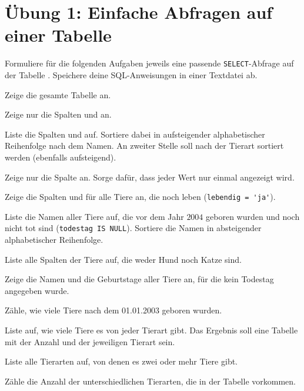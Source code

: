 \clearpage

\rehead[]{\textcolor{lightblue}{AvHG, Inf, My}}
\lohead[]{\textcolor{lightblue}{AvHG, Inf, My}}

\section{Übung 1: Einfache Abfragen auf einer Tabelle}

Formuliere für die folgenden Aufgaben jeweils eine passende
\lstinline|SELECT|-Abfrage auf der Tabelle . Speichere deine
SQL-Anweisungen in einer Textdatei ab.

\begin{compactenum}[a)]
\item Zeige die gesamte Tabelle  an.
\item Zeige nur die Spalten  und  an.
\item Liste die Spalten  und  auf.
Sortiere dabei in aufsteigender alphabetischer Reihenfolge nach dem Namen. An
zweiter Stelle soll nach der Tierart sortiert werden (ebenfalls aufsteigend).
\item Zeige nur die Spalte  an. Sorge dafür, dass jeder
Wert nur einmal angezeigt wird.
\item Zeige die Spalten  und  für alle
Tiere an, die noch leben (\lstinline|lebendig = 'ja'|).
\item Liste die Namen aller Tiere auf, die vor dem Jahr $2004$ geboren wurden
und noch nicht tot sind (\lstinline|todestag IS NULL|). Sortiere die Namen in
absteigender alphabetischer Reihenfolge.
\item Liste alle Spalten der Tiere auf, die weder Hund noch Katze sind.
\item Zeige die Namen und die Geburtstage aller Tiere an, für die kein
Todestag angegeben wurde.
\item Zähle, wie viele Tiere nach dem 01.01.2003 geboren wurden.
\item Liste auf, wie viele Tiere es von jeder Tierart gibt. Das Ergebnis soll
eine Tabelle mit der Anzahl und der jeweiligen Tierart sein.
\item Liste alle Tierarten auf, von denen es zwei oder mehr Tiere gibt.
\item Zähle die Anzahl der unterschiedlichen Tierarten, die in der Tabelle
vorkommen.
\end{compactenum}

